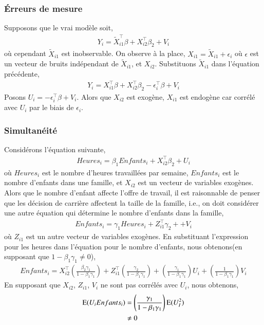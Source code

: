 \documentclass[10pt, reqno]{amsart}
\begin{document}
\subsubsection*{\'Erreurs de mesure}
Supposons que le vrai modèle soit,
\begin{align*}
Y_i = \tilde{X}_{i1}^\top\beta + X_{i2}^\top\beta_2 + V_i
\end{align*}
où cependant $\tilde{X}_{i1}$ est inobservable. On observe à la place, $X_{i1} =  \tilde{X}_{i1}+\epsilon_i$ où $\epsilon$ est un vecteur de bruits indépendant de $\tilde{X}_{i1}$, et $X_{i2}$. Substituons $\tilde{X}_{i1}$ dans l'équation précédente,
\begin{align*}
Y_i = X_{i1} ^\top\beta + X_{i2}^\top\beta_2 - \epsilon_i^\top\beta + V_i
\end{align*}
Posons $U_i = - \epsilon_i^\top\beta + V_i$. Alors que $ X_{i2}$ est exogène, $X_{i1}$ est endogène car  corrélé avec $U_i$ par le biais de $\epsilon_i$.
\subsubsection*{Simultanéité}
Considérons l'équation suivante,
\begin{align*}
Heures_i = \beta_1Enfants_i + X_{i2}^\top\beta_2 + U_i
\end{align*}
où $Heures_i$ est le nombre d'heures travaillées par semaine, $Enfants_i$ est le nombre d'enfants dans une famille, et $X_{i2}$ est un vecteur de variables exogènes. Alors que le nombre d'enfant affecte l'offre de travail, il est raisonnable de penser que les décision de carrière affectent la taille de la famille, i.e., on doit considérer une autre équation qui détermine le nombre d'enfants dans la famille,
\begin{align*}
Enfants_i = \gamma_1 Heures_i + Z_{i1}^\top\gamma_2+ + V_i
\end{align*}
où $ Z_{i1}$ est un autre vecteur de variables exogènes. En substituant l'expression pour les heures dans l'équation pour le nombre d'enfants, nous obtenons(en supposant que $1-\beta_1\gamma_1\neq 0$),
\begin{align*}
Enfants_i  = X_{i2}^\top\left(\frac{\beta_2\gamma_1}{1-\beta_1\gamma_1}\right) + Z_{i1}^\top \left(\frac{\gamma_2}{1-\beta_1\gamma_1}\right) + \left(\frac{\gamma_1}{1-\beta_1\gamma_1}\right)U_i + \left(\frac{1}{1-\beta_1\gamma_1}\right)V_i
\end{align*}
En supposant que $X_{i2}$, $Z_{i1}$, $V_i$ ne sont pas corrélés avec $U_i$, nous obtenons,
\begin{align*}
\operatorname{E}(U_iEnfants_i) &= \left(\frac{\gamma_1}{1-\beta_1\gamma_1}\right)\operatorname{E}(U_I^2)\\
&\neq 0
\end{align*}
\end{document}

